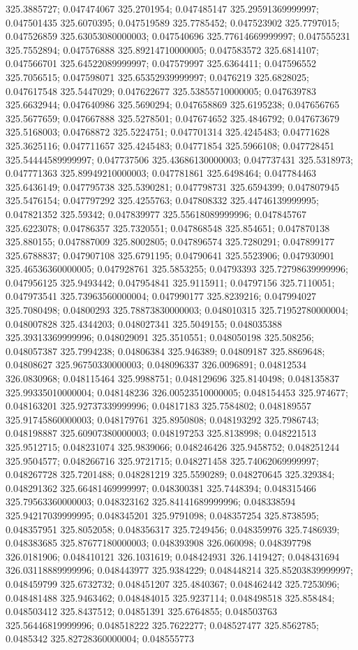 325.3885727; 0.047474067 325.2701954; 0.047485147 325.29591369999997; 0.047501435 325.6070395; 0.047519589 325.7785452; 0.047523902 325.7797015; 0.047526859 325.63053080000003; 0.047540696 325.77614669999997; 0.047555231 325.7552894; 0.047576888 325.89214710000005; 0.047583572 325.6814107; 0.047566701 325.64522089999997; 0.047579997 325.6364411; 0.047596552 325.7056515; 0.047598071 325.65352939999997; 0.0476219 325.6828025; 0.047617548 325.5447029; 0.047622677 325.53855710000005; 0.047639783 325.6632944; 0.047640986 325.5690294; 0.047658869 325.6195238; 0.047656765 325.5677659; 0.047667888 325.5278501; 0.047674652 325.4846792; 0.047673679 325.5168003; 0.04768872 325.5224751; 0.047701314 325.4245483; 0.04771628 325.3625116; 0.047711657 325.4245483; 0.04771854 325.5966108; 0.047728451 325.54444589999997; 0.047737506 325.43686130000003; 0.047737431 325.5318973; 0.047771363 325.89949210000003; 0.047781861 325.6498464; 0.047784463 325.6436149; 0.047795738 325.5390281; 0.047798731 325.6594399; 0.047807945 325.5476154; 0.047797292 325.4255763; 0.047808332 325.44746139999995; 0.047821352 325.59342; 0.047839977 325.55618089999996; 0.047845767 325.6223078; 0.04786357 325.7320551; 0.047868548 325.854651; 0.047870138 325.880155; 0.047887009 325.8002805; 0.047896574 325.7280291; 0.047899177 325.6788837; 0.047907108 325.6791195; 0.04790641 325.5523906; 0.047930901 325.46536360000005; 0.047928761 325.5853255; 0.04793393 325.72798639999996; 0.047956125 325.9493442; 0.047954841 325.9115911; 0.04797156 325.7110051; 0.047973541 325.73963560000004; 0.047990177 325.8239216; 0.047994027 325.7080498; 0.04800293 325.78873830000003; 0.048010315 325.71952780000004; 0.048007828 325.4344203; 0.048027341 325.5049155; 0.048035388 325.39313369999996; 0.048029091 325.3510551; 0.048050198 325.508256; 0.048057387 325.7994238; 0.04806384 325.946389; 0.04809187 325.8869648; 0.04808627 325.96750330000003; 0.048096337 326.0096891; 0.04812534 326.0830968; 0.048115464 325.9988751; 0.048129696 325.8140498; 0.048135837 325.99335010000004; 0.048148236 326.00523510000005; 0.048154453 325.974677; 0.048163201 325.92737339999996; 0.04817183 325.7584802; 0.048189557 325.91745860000003; 0.048179761 325.8950808; 0.048193292 325.7986743; 0.048198887 325.60907380000003; 0.048197253 325.8138998; 0.048221513 325.9512715; 0.048231074 325.9839066; 0.048246426 325.9458752; 0.048251244 325.9504577; 0.048266716 325.9721715; 0.048271458 325.74062069999997; 0.048267728 325.7201488; 0.048281219 325.5590289; 0.048270645 325.329384; 0.048291362 325.66481469999997; 0.048300381 325.7448394; 0.048315466 325.79563360000003; 0.048323162 325.84141689999996; 0.048338594 325.94217039999995; 0.048345201 325.9791098; 0.048357254 325.8738595; 0.048357951 325.8052058; 0.048356317 325.7249456; 0.048359976 325.7486939; 0.048383685 325.87677180000003; 0.048393908 326.060098; 0.048397798 326.0181906; 0.048410121 326.1031619; 0.048424931 326.1419427; 0.048431694 326.03118889999996; 0.048443977 325.9384229; 0.048448214 325.85203839999997; 0.048459799 325.6732732; 0.048451207 325.4840367; 0.048462442 325.7253096; 0.048481488 325.9463462; 0.048484015 325.9237114; 0.048498518 325.858484; 0.048503412 325.8437512; 0.04851391 325.6764855; 0.048503763 325.56446819999996; 0.048518222 325.7622277; 0.048527477 325.8562785; 0.0485342 325.82728360000004; 0.048555773 